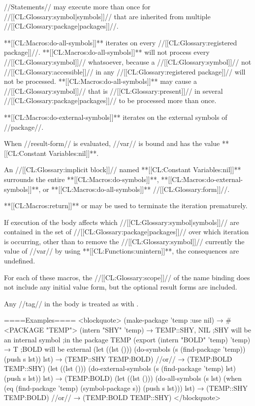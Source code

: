//Statements// may execute more than once for //[[CL:Glossary:symbol|symbols]]// that are inherited from multiple //[[CL:Glossary:package|packages]]//.

**[[CL:Macros:do-all-symbols]]** iterates on every //[[CL:Glossary:registered package]]//. **[[CL:Macros:do-all-symbols]]** will not process every //[[CL:Glossary:symbol]]// whatsoever, because a //[[CL:Glossary:symbol]]// not //[[CL:Glossary:accessible]]// in any //[[CL:Glossary:registered package]]// will not be processed. **[[CL:Macros:do-all-symbols]]** may cause a //[[CL:Glossary:symbol]]// that is //[[CL:Glossary:present]]// in several //[[CL:Glossary:package|packages]]// to be processed more than once.

**[[CL:Macros:do-external-symbols]]** iterates on the external symbols of //package//.

When //result-form// is evaluated, //var// is bound and has the value **[[CL:Constant Variables:nil]]**.

An //[[CL:Glossary:implicit block]]// named **[[CL:Constant Variables:nil]]** surrounds the entire **[[CL:Macros:do-symbols]]**, **[[CL:Macros:do-external-symbols]]**, or **[[CL:Macros:do-all-symbols]]** //[[CL:Glossary:form]]//.

**[[CL:Macros:return]]** or  may be used to terminate the iteration prematurely.

If execution of the body affects which //[[CL:Glossary:symbol|symbols]]// are contained in the set of //[[CL:Glossary:package|packages]]// over which iteration is occurring, other than to remove the //[[CL:Glossary:symbol]]// currently the value of //var// by using **[[CL:Functions:unintern]]**, the consequences are undefined.

For each of these macros, the //[[CL:Glossary:scope]]// of the name binding does not include any initial value form, but the optional result forms are included.

Any //tag// in the body is treated as with .

====Examples====
<blockquote> (make-package 'temp :use nil) → #<PACKAGE "TEMP"> (intern "SHY" 'temp) → TEMP::SHY, NIL ;SHY will be an internal symbol ;in the package TEMP (export (intern "BOLD" 'temp) 'temp) → T ;BOLD will be external (let ((lst ())) (do-symbols (s (find-package 'temp)) (push s lst)) lst) → (TEMP::SHY TEMP:BOLD) //or// → (TEMP:BOLD TEMP::SHY) (let ((lst ())) (do-external-symbols (s (find-package 'temp) lst) (push s lst)) lst) → (TEMP:BOLD) (let ((lst ())) (do-all-symbols (s lst) (when (eq (find-package 'temp) (symbol-package s)) (push s lst))) lst) → (TEMP::SHY TEMP:BOLD) //or// → (TEMP:BOLD TEMP::SHY) </blockquote>

